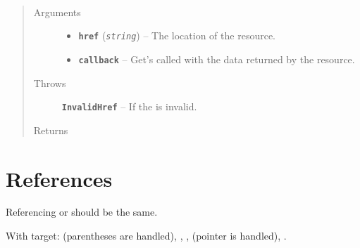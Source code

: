 \documentclass[letterpaper,10pt,english]{sphinxhowto}
\begin{document}

\begin{fulllineitems}
\label{objects:bar.baz}~\begin{quote}\begin{description}
\item[{Arguments}] \leavevmode\begin{itemize}
\item {} 
\textbf{\texttt{href}} (\emph{\texttt{string}}) -- The location of the resource.

\item {} 
\textbf{\texttt{callback}} -- Get's called with the data returned by the resource.

\end{itemize}

\item[{Throws}] \leavevmode
\textbf{\texttt{InvalidHref}} -- If the  is invalid.

\item[{Returns}] \leavevmode
{}

\end{description}\end{quote}

\end{fulllineitems}


\begin{fulllineitems}
\label{objects:bar.spam}
\end{fulllineitems}



\section{References}
\label{objects:references}
Referencing {\hyperref[objects:mod.Cls]{}} or {\hyperref[objects:mod.Cls]{}} should be the same.

With target: {\hyperref[objects:c.Sphinx_DoSomething]{}} (parentheses are handled),
{\hyperref[objects:c.SphinxStruct.member]{}}, {\hyperref[objects:c.SPHINX_USE_PYTHON]{}},
{\hyperref[objects:c.SphinxType]{}} (pointer is handled), {\hyperref[objects:c.sphinx_global]{}}.
\end{document}
